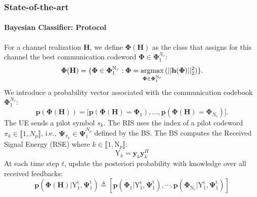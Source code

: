 \documentclass[11pt,aspectratio=1610]{beamer}
\DeclareMathOperator*{\argmax}{argmax}
\begin{document}

    \begin{frame}
        \frametitle{State-of-the-art}
        \framesubtitle{Bayesian Classifier: Protocol}
         For a channel realization $\mathbf H$, we define $\boldsymbol\Phi(\mathbf H)$ as the class that assigns for this channel the best communication codeword $\boldsymbol\Phi \in \boldsymbol\Phi_{1}^{N_c}$:
        \begin{equation*}
            \boldsymbol{\Phi}(\mathbf H) = \{\boldsymbol{\Phi} \in \boldsymbol{\Phi}_{1}^{\mathrm N_c} : \boldsymbol{\Phi} = \argmax_{\boldsymbol{\Phi} \in \boldsymbol{\Phi}_{1}^{\mathrm N_c}} \!\ (||\bold{h}(\boldsymbol{\Phi})||_2^2)\}.
        \end{equation*}
         We introduce a probability vector associated with the communication codebook $\boldsymbol\Phi_{1}^{N_c}$:
        \begin{equation*}
            \mathbf{p}(\boldsymbol\Phi(\mathbf{H})) = \Big[\mathbf{p}(\boldsymbol\Phi(\mathbf{H}) = \boldsymbol\Phi_{1}), \ldots, \mathbf{p}(\boldsymbol\Phi(\mathbf{H}) = \boldsymbol\Phi_{N_c})\Big].
        \end{equation*}
         The UE sends a pilot symbol $s_k$.
         The RIS uses the index of a pilot codeword $\pi_k \in \llbracket 1,N_p \rrbracket$, i.e., $\boldsymbol\Psi_{\pi_k} \in \boldsymbol{\Psi}_{1}^{N_p}$ defined by the BS.
         The BS computes the Received Signal Energy (RSE) where $k \in \llbracket 1,\mathrm N_p \rrbracket$:
        \begin{equation*}
            \mathrm Y_k = \mathbf y_k \mathbf y_k^{H}
        \end{equation*}
         At each time step $t$, update the posteriori probability with knowledge over all received feedbacks: 
        \begin{equation*}
            \mathbf{p}(\boldsymbol{\Phi}(\mathbf H)| \mathrm Y_{1}^{\mathrm t},\boldsymbol{\Psi}_{1}^{\mathrm t})\triangleq [\mathbf{p}(\boldsymbol{\Phi}_1| \mathrm Y_{1}^{\mathrm t},\boldsymbol{\Psi}_{1}^{\mathrm t}), \cdots, \mathbf{p}(\boldsymbol{\Phi}_{\mathrm N_c}| \mathrm Y_{1}^{\mathrm t},\boldsymbol{\Psi}_{1}^{\mathrm t})]
        \end{equation*}
    \end{frame}
    
\end{document}
